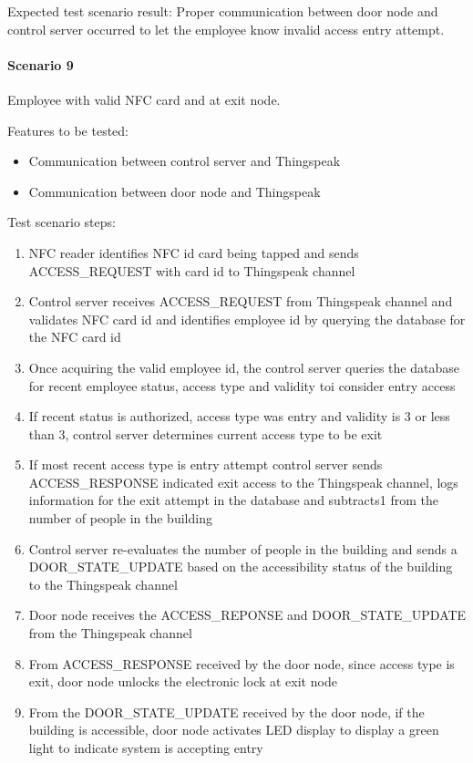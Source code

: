\noindent
Expected test scenario result: Proper communication between door node and
control server occurred to let the employee know invalid access entry attempt.

\paragraph{Scenario 9}
Employee with valid NFC card and at exit node.

\noindent
Features to be tested:
\begin{itemize}
    \item Communication between control server and Thingspeak
    \item Communication between door node and Thingspeak
\end{itemize}

\noindent
Test scenario steps:
\begin{enumerate}
    \item NFC reader identifies NFC id card being tapped and sends
          ACCESS\_REQUEST with card id to Thingspeak channel
    \item Control server receives ACCESS\_REQUEST from Thingspeak channel and
          validates NFC card id and identifies employee id by querying the
          database for the NFC card id 
    \item Once acquiring the valid employee id, the control server queries the
          database for recent employee status, access type and validity toi
          consider entry access
    \item If recent status is authorized, access type was entry and validity is
          3 or less than 3, control server determines current access type to be
          exit 
    \item If most recent access type is entry attempt control server sends
          ACCESS\_RESPONSE indicated exit access to the Thingspeak channel, logs
          information for the exit attempt in the database and subtracts1 from
          the number of people in the building  
    \item Control server re-evaluates the number of people in the building and
          sends a DOOR\_STATE\_UPDATE based on the accessibility status of the
          building to the Thingspeak channel
    \item Door node receives the ACCESS\_REPONSE and DOOR\_STATE\_UPDATE from
          the Thingspeak channel
    \item From ACCESS\_RESPONSE received by the door node, since access type is
          exit, door node unlocks the electronic lock at exit node 
    \item From the DOOR\_STATE\_UPDATE received by the door node, if the
          building is accessible, door node activates LED display to display a
          green light to indicate system is accepting entry
\end{enumerate}


